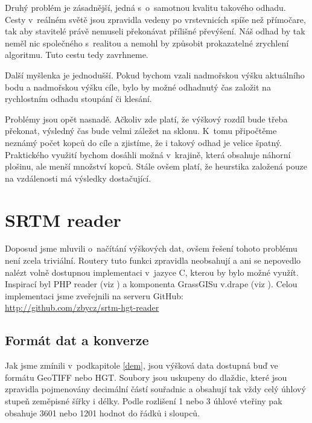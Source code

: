 \documentclass[thesis=B,czech]{FITthesis}[2012/06/26]
\begin{document}
Druhý problém je zásadnější, jedná s~o~samotnou kvalitu takového odhadu. Cesty v~reálném světě jsou zpravidla vedeny po vrstevnicích spíše než přímočare, tak aby stavitelé právě nemuseli překonávat přílišné převýšení. Náš odhad by tak neměl nic společného s~realitou a nemohl by způsobit prokazatelné zrychlení algoritmu. Tuto cestu tedy zavrhneme.

Další myšlenka je jednodušší. Pokud bychom vzali nadmořskou výšku aktuálního bodu a nadmořskou výšku cíle, bylo by možné odhadnutý čas založit na rychlostním odhadu stoupání či klesání. 

Problémy jsou opět nasnadě. Ačkoliv zde platí, že výškový rozdíl bude třeba překonat, výsledný čas bude velmi záležet na sklonu. K~tomu připočtěme neznámý počet kopců do cíle a zjistíme, že i takový odhad je velice špatný. Praktického využití bychom dosáhli možná v~krajině, která obsahuje náhorní plošinu, ale menší množství kopců. Stále ovšem platí, že heurstika založená pouze na vzdálenosti má výsledky dostačující.


\section{SRTM reader}
Doposud jsme mluvili o~načítání výškových dat, ovšem řešení tohoto problému není zcela triviální. Routery tuto funkci zpravidla neobsahují a ani se nepovedlo nalézt volně dostupnou implementaci v~jazyce C, kterou by bylo možné využít. Inspirací byl PHP reader (viz \cite{osola}) a komponenta GrassGISu v.drape (viz \cite{grassgis}). Celou implementaci jsme zveřejnili na serveru GitHub: \\  \href{https://github.com/zbycz/srtm-hgt-reader}{http://github.com/zbycz/srtm-hgt-reader}



\subsection{Formát dat a konverze}

Jak jsme zmínili v~podkapitole \ref{dem}, jsou výšková data dostupná buď ve formátu GeoTIFF nebo HGT. Soubory jsou uskupeny do dlaždic, které jsou zpravidla pojmenovány decimální částí souřadnic a obsahují tak vždy celý úhlový stupeň zeměpisné šířky i délky. Podle rozlišení 1 nebo 3 úhlové vteřiny pak obsahuje 3601 nebo 1201 hodnot do řádků i sloupců.
\end{document}

